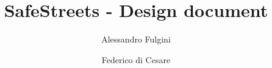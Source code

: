 \documentclass[draft=false]{scrreprt}
\title{SafeStreets - Design document}
\author{Alessandro Fulgini \and Federico di Cesare}
\begin{document}
  \begin{titlepage}
    
  \end{titlepage}
  

  \tableofcontents

  
  
\end{document}
